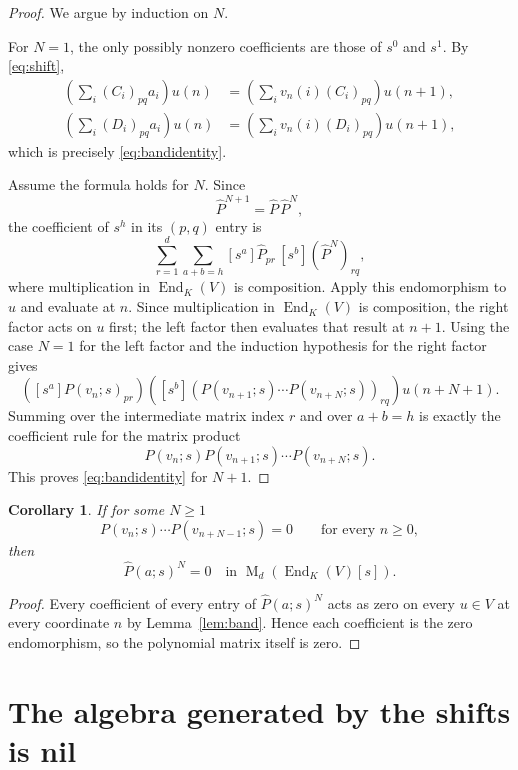 \documentclass[11pt]{article}
\newtheorem{corollary}[theorem]{Corollary}
\newcommand{\End}{\operatorname{End}}
\newcommand{\Mat}{\operatorname{M}}
\newcommand{\coeff}[2]{[s^{#1}]#2}
\begin{document}
\begin{proof}
We argue by induction on $N$.

For $N=1$, the only possibly nonzero coefficients are those of $s^0$ and $s^1$.  By \eqref{eq:shift},
\begin{align*}
\left(\sum_i(C_i)_{pq}a_i\right)u(n)
&=\left(\sum_i v_n(i)(C_i)_{pq}\right)u(n+1),\\
\left(\sum_i(D_i)_{pq}a_i\right)u(n)
&=\left(\sum_i v_n(i)(D_i)_{pq}\right)u(n+1),
\end{align*}
which is precisely \eqref{eq:bandidentity}.

Assume the formula holds for $N$.  Since
\[
\widehat P^{N+1}=\widehat P\,\widehat P^N,
\]
the coefficient of $s^h$ in its $(p,q)$ entry is
\[
\sum_{r=1}^d\sum_{a+b=h}
\coeff{a}{\widehat P_{pr}}\,
\coeff{b}{(\widehat P^N)_{rq}},
\]
where multiplication in $\End_K(V)$ is composition.  Apply this endomorphism to $u$ and evaluate at $n$.  Since multiplication in $\End_K(V)$ is composition, the right factor acts on $u$ first; the left factor then evaluates that result at $n+1$.  Using the case $N=1$ for the left factor and the induction hypothesis for the right factor gives
\[
\left(\coeff{a}{P(v_n;s)_{pr}}\right)
\left(\coeff{b}{(P(v_{n+1};s)\cdots P(v_{n+N};s))_{rq}}\right)u(n+N+1).
\]
Summing over the intermediate matrix index $r$ and over $a+b=h$ is exactly the coefficient rule for the matrix product
\[
P(v_n;s)P(v_{n+1};s)\cdots P(v_{n+N};s).
\]
This proves \eqref{eq:bandidentity} for $N+1$.
\end{proof}

\begin{corollary}\label{cor:window-nilpotent}
If for some $N\ge1$
\[
P(v_n;s)\cdots P(v_{n+N-1};s)=0
\qquad\text{for every }n\ge0,
\]
then
\[
\widehat P(a;s)^N=0
\quad\text{in }\Mat_d(\End_K(V)[s]).
\]
\end{corollary}

\begin{proof}
Every coefficient of every entry of $\widehat P(a;s)^N$ acts as zero on every $u\in V$ at every coordinate $n$ by Lemma~\ref{lem:band}.  Hence each coefficient is the zero endomorphism, so the polynomial matrix itself is zero.
\end{proof}

\section{The algebra generated by the shifts is nil}\label{sec:nil}
\end{document}

